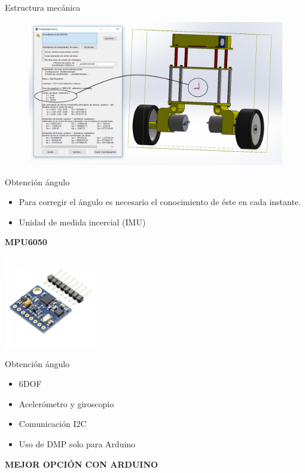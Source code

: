 \documentclass{beamer}
\begin{document}
\begin{frame}{Estructura mecánica}
	\begin{figure}[H]
		\center
		\includegraphics[scale=0.3]{imagenes/Balancing_robot/center_mass}
	\end{figure}
\end{frame}

\begin{frame}{Obtención ángulo}
\begin{block}{}
	\begin{itemize}
		\item Para corregir el ángulo es necesario el conocimiento de éste en cada instante.\pause
		\item Unidad de medida incercial (IMU) \pause
	\end{itemize}
\end{block}
\begin{alertblock}{}
	\centering \textbf{MPU6050} 
\end{alertblock}
	\begin{center}
	\includegraphics [width =0.3\textwidth ]{imagenes/EstadoArte/IMU1}
\end{center}
\end{frame}

\begin{frame}{Obtención ángulo}
		\begin{block}{}
			\begin{itemize}
				\item 6DOF \pause
				\item Acelerómetro y giroscopio \pause
				\item Comunicación I2C \pause
				\item Uso de DMP solo para Arduino \pause
			\end{itemize}
		\end{block}
		\begin{alertblock}{}
			\centering \textbf{MEJOR OPCIÓN CON ARDUINO} 
		\end{alertblock}
\end{frame}
\end{document}
